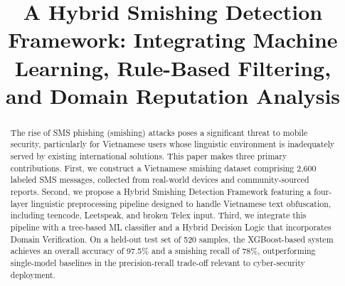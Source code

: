 \documentclass[conference]{IEEEtran}
\begin{document}
\title{A Hybrid Smishing Detection Framework: Integrating Machine Learning,
Rule-Based Filtering, and Domain Reputation Analysis}






\author{
}

\maketitle

\begin{abstract}
The rise of SMS phishing (smishing) attacks poses a significant threat to
mobile security, particularly for Vietnamese users whose linguistic environment
is inadequately served by existing international solutions.
This paper makes three primary contributions.
First, we construct a Vietnamese smishing dataset comprising 2,600
labeled SMS messages, collected from real-world devices and
community-sourced reports.
Second, we propose a Hybrid Smishing Detection Framework featuring a
four-layer linguistic preprocessing pipeline designed to handle
Vietnamese text obfuscation, including teencode, Leetspeak, and broken Telex
input.
Third, we integrate this pipeline with a tree-based ML classifier and a
Hybrid Decision Logic that incorporates Domain Verification.
On a held-out test set of 520 samples, the XGBoost-based system achieves an
overall accuracy of 97.5\% and a smishing recall of 78\%, outperforming
single-model baselines in the precision-recall trade-off relevant to
cyber-security deployment.
\end{abstract}
\end{document}
